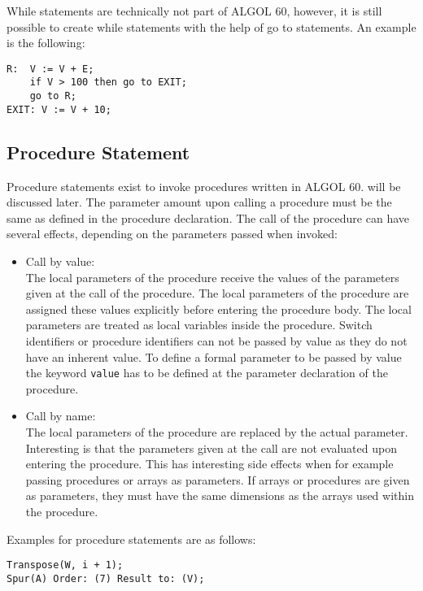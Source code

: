 \documentclass{article}
\begin{document}
While statements are technically not part of ALGOL 60, however, it is still possible to create while statements with the help of go to statements. An example is the following:\\

\begin{lstlisting}[language={[60]algol}]
R:  V := V + E;
    if V > 100 then go to EXIT;
    go to R;
EXIT: V := V + 10;
\end{lstlisting}


\subsection{Procedure Statement} \label{ProcStat}
Procedure statements exist to invoke procedures written in ALGOL 60.  will be discussed later. The parameter amount upon calling a procedure must be the same as defined in the procedure declaration. The call of the procedure can have several effects, depending on the parameters passed when invoked:

\begin{itemize}
	\item Call by value:\\
	The local parameters of the procedure receive the values of the parameters given at the call of the procedure. The local parameters of the procedure are assigned these values explicitly before entering the procedure body. The local parameters are treated as local variables inside the procedure. Switch identifiers or procedure identifiers can not be passed by value as they do not have an inherent value. To define a formal parameter to be passed by value the keyword \texttt{value} has to be defined at the parameter declaration of the procedure.
	\item Call by name:\\
	The local parameters of the procedure are replaced by the actual parameter. Interesting is that the parameters given at the call are not evaluated upon entering the procedure. This has interesting side effects when for example passing procedures or arrays as parameters. If arrays or procedures are given as parameters, they must have the same dimensions as the arrays used within the procedure.
\end{itemize}

Examples for procedure statements are as follows:\\ 
\begin{lstlisting}[language={[60]algol}]
Transpose(W, i + 1);
Spur(A) Order: (7) Result to: (V);
\end{lstlisting}
\end{document}
